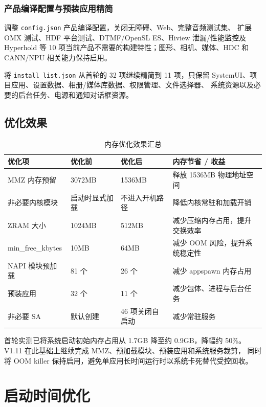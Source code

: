 \subsubsection{产品编译配置与预装应用精简}

调整 \texttt{config.json} 产品编译配置，关闭无障碍、Web、完整音频测试集、
扩展 OMX 测试、HDF 平台测试、DTMF/OpenSL ES、Hiview 泄漏/性能监控及
Hyperhold 等 10 项当前产品不需要的构建特性；图形、相机、媒体、HDC 和
CANN/NPU 相关能力保持启用。

将 \texttt{install\_list.json} 从首轮的 32 项继续精简到 11 项，只保留
SystemUI、项目应用、设置数据、相册/媒体库数据、权限管理、文件选择器、
系统资源以及必要的后台任务、电源和通知对话框资源。

\subsection{优化效果}

\begin{table}[htbp]
  \centering
  \caption{内存优化效果汇总}
  \label{tab:memory-optimization}
  \begin{tabular}{llll}
    \toprule
    优化项 & 优化前 & 优化后 & 内存节省 / 收益 \\
    \midrule
    MMZ 内存预留 & 3072MB & 1536MB & 释放 1536MB 物理地址空间 \\
    非必要内核模块 & 启动时显式加载 & 不进入开机路径 & 降低内核常驻和加载开销 \\
    ZRAM 大小 & 1024MB & 512MB & 减少压缩内存占用，提升交换效率 \\
    min\_free\_kbytes & 10MB & 64MB & 减少 OOM 风险，提升系统稳定性 \\
    NAPI 模块预加载 & 81 个 & 26 个 & 减少 appspawn 内存占用 \\
    预装应用 & 32 个 & 11 个 & 减少包体、进程与后台任务 \\
    非必要 SA & 默认创建 & 46 项关闭自启动 & 减少常驻服务 \\
    \bottomrule
  \end{tabular}
\end{table}

首轮实测已将系统启动初始内存占用从 1.7GB 降至约 0.9GB，降幅约
50\%。V1.11 在此基础上继续完成 MMZ、预加载模块、预装应用和系统服务裁剪，
同时将 OOM killer 保持启用，避免单应用长时间运行时以系统卡死替代受控回收。


\section{启动时间优化}

